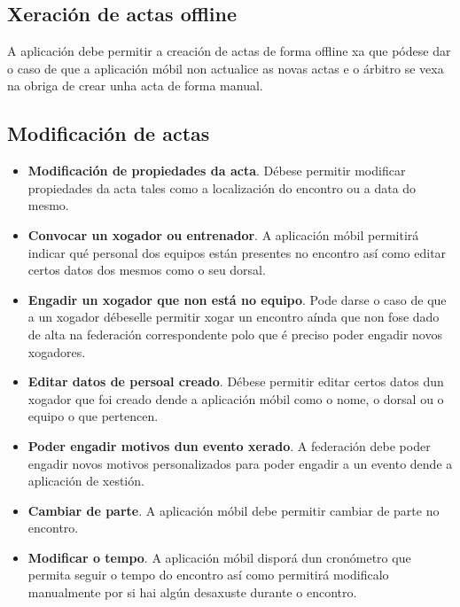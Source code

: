  \subsection{Xeración de actas offline}
  A aplicación debe permitir a creación de actas de forma offline xa que pódese 
dar o caso de que a aplicación móbil non actualice as novas actas e o árbitro 
se vexa na obriga de crear unha acta de forma manual.

  \subsection{Modificación de actas}

    \begin{itemize}

    \item \textbf{Modificación de propiedades da acta}.
    Débese permitir modificar propiedades da acta tales como a localización 
do encontro ou a data do mesmo.

    \item \textbf{Convocar un xogador ou entrenador}.
    A aplicación móbil permitirá indicar qué personal dos equipos están 
presentes no encontro así como editar certos datos dos mesmos como o seu dorsal.

    \item \textbf{Engadir un xogador que non está no equipo}.
    Pode darse o caso de que a un xogador débeselle permitir xogar un encontro 
aínda que non fose dado de alta na federación correspondente polo que é preciso 
poder engadir novos xogadores.

    \item \textbf{Editar datos de persoal creado}.
    Débese permitir editar certos datos dun xogador que foi creado dende 
a aplicación móbil como o nome, o dorsal ou o equipo o que pertencen.

    \item \textbf{Poder engadir motivos dun evento xerado}.
    A federación debe poder engadir novos motivos personalizados para poder 
engadir a un evento dende a aplicación de xestión.

    \item \textbf{Cambiar de parte}.
    A aplicación móbil debe permitir cambiar de parte no encontro.

    \item \textbf{Modificar o tempo}.
    A aplicación móbil disporá dun cronómetro que permita seguir o tempo do 
encontro así como permitirá modificalo manualmente por si hai algún desaxuste 
durante o encontro.


\end{itemize}
